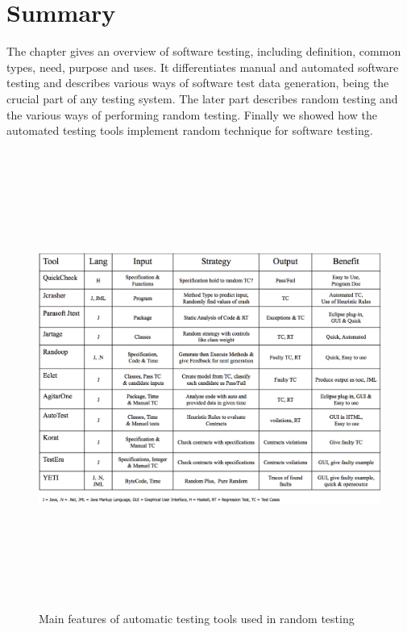 
\section{Summary}
The chapter gives an overview of software testing, including definition, common types, need, purpose and uses. It differentiates manual and automated software testing and describes various ways of software test data generation, being the crucial part of any testing system. The later part describes random testing and the various ways of performing random testing. Finally we showed how the automated testing tools implement random technique for software testing.



\begin{figure}[H]
	\centering
	\centerline{\includegraphics[width=15.5cm, height=15cm]{chapter2/Tools.png}}
	\caption{Main features of automatic testing tools used in random testing}
	\label{fig:Tools}
\end{figure}



